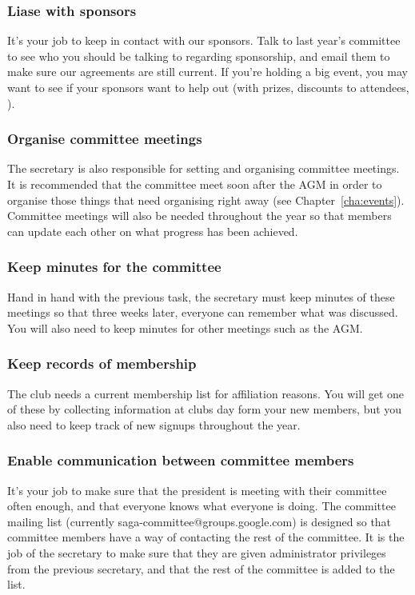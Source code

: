 \subsubsection{Liase with sponsors}

It's your job to keep in contact with our sponsors. Talk to last year's committee to see who you should be talking to regarding sponsorship, and email them to make sure our agreements are still current. If you're holding a big event, you may want to see if your sponsors want to help out (with prizes, discounts to attendees, \etc).

\subsubsection{Organise committee meetings}

The secretary is also responsible for setting and organising committee meetings. It is recommended that the committee meet soon after the AGM in order to organise those things that need organising right away (see Chapter~\ref{cha:events}). Committee meetings will also be needed throughout the year so that members can update each other on what progress has been achieved.

\subsubsection{Keep minutes for the committee}

Hand in hand with the previous task, the secretary must keep minutes of these meetings so that three weeks later, everyone can remember what was discussed. You will also need to keep minutes for other meetings such as the AGM.

\subsubsection{Keep records of membership}

The club needs a current membership list for affiliation reasons. You will get one of these by collecting information at clubs day form your new members, but you also need to keep track of new signups throughout the year.

\subsubsection{Enable communication between committee members}

It's your job to make sure that the president is meeting with their committee often enough, and that everyone knows what everyone is doing. The committee mailing list (currently saga-committee@groups.google.com) is designed so that committee members have a way of contacting the rest of the committee. It is the job of the secretary to make sure that they are given administrator privileges from the previous secretary, and that the rest of the committee is added to the list.

